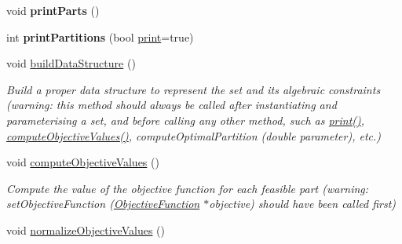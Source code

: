 \begin{DoxyCompactItemize}
\item 
\hypertarget{classNonconstrainedSet_aef678b21e8d249236aa0fd601599eee7}{void {\bfseries print\-Parts} ()}\label{classNonconstrainedSet_aef678b21e8d249236aa0fd601599eee7}

\item 
\hypertarget{classNonconstrainedSet_aa82880d02050df39dee205aef8b5fded}{int {\bfseries print\-Partitions} (bool \hyperlink{classNonconstrainedSet_a7d08b45f9f37f5285fee36fb98aa58af}{print}=true)}\label{classNonconstrainedSet_aa82880d02050df39dee205aef8b5fded}

\item 
\hypertarget{classNonconstrainedSet_af9e6644582edf44d7bcf4e4b64a08bc0}{void \hyperlink{classNonconstrainedSet_af9e6644582edf44d7bcf4e4b64a08bc0}{build\-Data\-Structure} ()}\label{classNonconstrainedSet_af9e6644582edf44d7bcf4e4b64a08bc0}

\begin{DoxyCompactList}\small\item\em Build a proper data structure to represent the set and its algebraic constraints (warning\-: this method should always be called after instantiating and parameterising a set, and before calling any other method, such as \hyperlink{classNonconstrainedSet_a7d08b45f9f37f5285fee36fb98aa58af}{print()}, \hyperlink{classNonconstrainedSet_a54d78c6dda39fd6d98c6f151b7350a02}{compute\-Objective\-Values()}, compute\-Optimal\-Partition (double parameter), etc.) \end{DoxyCompactList}\item 
\hypertarget{classNonconstrainedSet_a54d78c6dda39fd6d98c6f151b7350a02}{void \hyperlink{classNonconstrainedSet_a54d78c6dda39fd6d98c6f151b7350a02}{compute\-Objective\-Values} ()}\label{classNonconstrainedSet_a54d78c6dda39fd6d98c6f151b7350a02}

\begin{DoxyCompactList}\small\item\em Compute the value of the objective function for each feasible part (warning\-: set\-Objective\-Function (\hyperlink{classObjectiveFunction}{Objective\-Function} $\ast$objective) should have been called first) \end{DoxyCompactList}\item 
\hypertarget{classNonconstrainedSet_a8f9d197b844e06d1efc08215f6c38f88}{void \hyperlink{classNonconstrainedSet_a8f9d197b844e06d1efc08215f6c38f88}{normalize\-Objective\-Values} ()}\label{classNonconstrainedSet_a8f9d197b844e06d1efc08215f6c38f88}


\end{DoxyCompactItemize}

